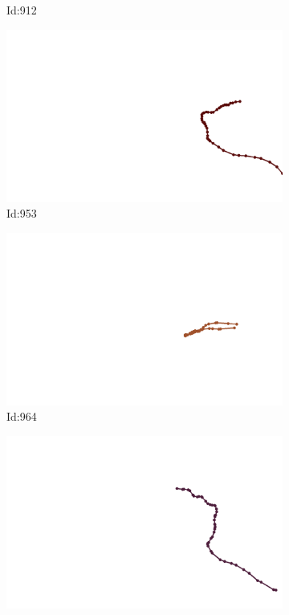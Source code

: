 \documentclass[12pt,twoside]{report}
\begin{document}
\begin{figure}
\begin{subfigure}[b]{0.20\textwidth}
\caption{Id:912}
\end{subfigure}
\begin{subfigure}[b]{0.20\textwidth}
\centering
\includegraphics[width=\textwidth]{../trajectories/953.png}
\caption{Id:953}
\end{subfigure}
\begin{subfigure}[b]{0.20\textwidth}
\centering
\includegraphics[width=\textwidth]{../trajectories/964.png}
\caption{Id:964}
\end{subfigure}
\begin{subfigure}[b]{0.20\textwidth}
\centering
\includegraphics[width=\textwidth]{../trajectories/977.png}

\end{subfigure}
\end{figure}
\end{document}
